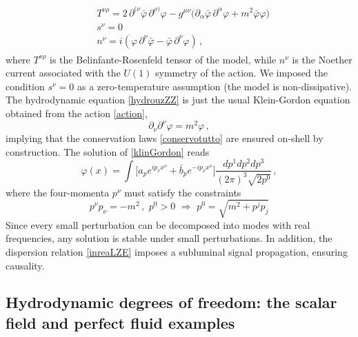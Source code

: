 \documentclass[a4paper, amsfonts, amssymb, amsmath, reprint, twocolumn, showkeys, nofootinbib]{revtex4-2}
\begin{document}
\begin{align}\label{defiziokleim}
\begin{split}
& T^{\nu \rho} = 2 \, \partial^{(\nu} \bar{\varphi} \, \partial^{\rho )} \varphi - g^{\mu \nu} \big( \partial_\alpha  \bar{\varphi} \, \partial^\alpha \varphi +  m^2 \bar{\varphi} \varphi \big) 
 \\
&  s^\nu =0 
  \\
&  n^\nu = i (\varphi \, \partial^\nu \bar{\varphi} - \bar{\varphi} \, \partial^\nu \varphi) \, ,   
  \end{split}
 \end{align}
where $ T^{\nu \rho}$ is the Belinfante-Rosenfeld tensor of the model, while $n^\nu$ is the Noether current associated with the $U(1)$ symmetry of the action. We imposed the condition $s^\nu =0$ as a zero-temperature assumption (the model is non-dissipative). 
The hydrodynamic equation \eqref{hydrouzZZ} is just the usual Klein-Gordon equation obtained from the action \eqref{action},
\begin{equation}\label{klinGordon}
\partial_\nu \partial^\nu \varphi = m^2 \varphi \, ,
\end{equation}
implying that the conservation laws \eqref{conservotutto} are ensured on-shell by construction. 
The solution of \eqref{klinGordon} reads
\begin{equation}\label{soluzionediklein}
\varphi(x) = \int \bigg[ a_p e^{i p_\nu x^\nu} + \bar{b}_p e^{-i p_\nu x^\nu} \bigg] 
\dfrac{dp^1 dp^2 dp^3}{(2\pi)^3\sqrt{2p^0}} \, ,
\end{equation}
where the four-momenta $p^\nu$ must satisfy the constraints
\begin{equation}
\label{inreaLZE}
p^\nu p_\nu =-m^2 \, ,  \, \,    p^0 >0 
 \, \,  \Rightarrow \, \, p^0 = \sqrt{m^2 + p^j p_j}  
\end{equation}
Since every small perturbation can be decomposed into modes with real frequencies, any solution is stable under small perturbations. In addition, the dispersion relation \eqref{inreaLZE} imposes a subluminal signal propagation, ensuring causality. 


\subsection{Hydrodynamic degrees of freedom: the scalar field and perfect fluid examples} \label{vrif} 
\end{document}

